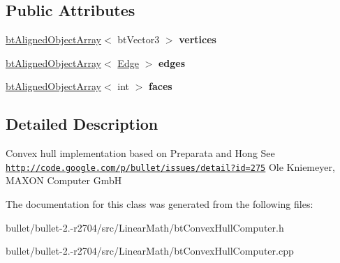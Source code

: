 \subsection*{Public Attributes}
\begin{DoxyCompactItemize}
\item 
\hypertarget{classbt_convex_hull_computer_a44b13cded1cd7726d3f18c2f6f98c7cc}{\hyperlink{classbt_aligned_object_array}{bt\+Aligned\+Object\+Array}$<$ bt\+Vector3 $>$ {\bfseries vertices}}\label{classbt_convex_hull_computer_a44b13cded1cd7726d3f18c2f6f98c7cc}

\item 
\hypertarget{classbt_convex_hull_computer_afd8c62200e928bf2db95ee77ed9dc887}{\hyperlink{classbt_aligned_object_array}{bt\+Aligned\+Object\+Array}$<$ \hyperlink{classbt_convex_hull_computer_1_1_edge}{Edge} $>$ {\bfseries edges}}\label{classbt_convex_hull_computer_afd8c62200e928bf2db95ee77ed9dc887}

\item 
\hypertarget{classbt_convex_hull_computer_ac63efa14dad485f2210ac9f6a33bbd95}{\hyperlink{classbt_aligned_object_array}{bt\+Aligned\+Object\+Array}$<$ int $>$ {\bfseries faces}}\label{classbt_convex_hull_computer_ac63efa14dad485f2210ac9f6a33bbd95}

\end{DoxyCompactItemize}


\subsection{Detailed Description}
Convex hull implementation based on Preparata and Hong See \href{http://code.google.com/p/bullet/issues/detail?id=275}{\tt http\+://code.\+google.\+com/p/bullet/issues/detail?id=275} Ole Kniemeyer, M\+A\+X\+O\+N Computer Gmb\+H 

The documentation for this class was generated from the following files\+:\begin{DoxyCompactItemize}
\item 
bullet/bullet-\/2.-\/r2704/src/\+Linear\+Math/bt\+Convex\+Hull\+Computer.\+h\item 
bullet/bullet-\/2.-\/r2704/src/\+Linear\+Math/bt\+Convex\+Hull\+Computer.\+cpp\end{DoxyCompactItemize}
